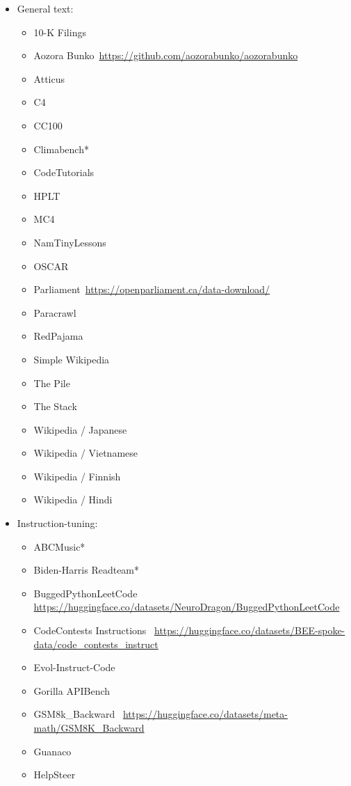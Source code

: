 \begin{itemize}
\item General text:
    \begin{itemize}
    \item 10-K Filings
    \item Aozora Bunko~{\tiny\url{https://github.com/aozorabunko/aozorabunko}}
    \item Atticus
    \item C4
    \item CC100
    \item Climabench*
    \item CodeTutorials
    \item HPLT
    \item MC4
    \item NamTinyLessons
    \item OSCAR
    \item Parliament~{\tiny\url{https://openparliament.ca/data-download/}}
    \item Paracrawl
    \item RedPajama
    \item Simple Wikipedia
    \item The Pile
    \item The Stack
    \item Wikipedia / Japanese
    \item Wikipedia / Vietnamese
    \item Wikipedia / Finnish
    \item Wikipedia / Hindi
    \end{itemize}
\item Instruction-tuning:
    \begin{itemize}
    \item ABCMusic*
    \item Biden-Harris Readteam*
    \item BuggedPythonLeetCode~ {\tiny\url{https://huggingface.co/datasets/NeuroDragon/BuggedPythonLeetCode}}
    \item CodeContests Instructions~  {\tiny\url{https://huggingface.co/datasets/BEE-spoke-data/code_contests_instruct}}
    \item Evol-Instruct-Code~\citep{xu2023wizardlm}
    \item Gorilla APIBench
    \item GSM8k\_Backward~ {\tiny\url{https://huggingface.co/datasets/meta-math/GSM8K_Backward}}
    \item Guanaco
    \item HelpSteer~\citep{wang2023helpsteer}

\end{itemize}
\end{itemize}

